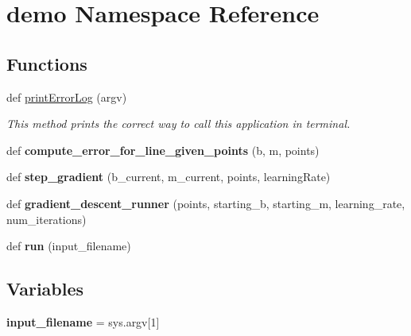 \hypertarget{namespacedemo}{}\section{demo Namespace Reference}
\label{namespacedemo}
\subsection*{Functions}
\begin{DoxyCompactItemize}
\item 
def \hyperlink{namespacedemo_a23277e53eb57a96c8b18995863f1d04b}{print\+Error\+Log} (argv)
\begin{DoxyCompactList}\small\item\em This method prints the correct way to call this application in terminal. \end{DoxyCompactList}\item 
def {\bfseries compute\+\_\+error\+\_\+for\+\_\+line\+\_\+given\+\_\+points} (b, m, points)\hypertarget{namespacedemo_a76e4af918335272a62d51f5d40c4bf59}{}\label{namespacedemo_a76e4af918335272a62d51f5d40c4bf59}

\item 
def {\bfseries step\+\_\+gradient} (b\+\_\+current, m\+\_\+current, points, learning\+Rate)\hypertarget{namespacedemo_aabf6ac3a1e04d278cceeffa54c1a0e2e}{}\label{namespacedemo_aabf6ac3a1e04d278cceeffa54c1a0e2e}

\item 
def {\bfseries gradient\+\_\+descent\+\_\+runner} (points, starting\+\_\+b, starting\+\_\+m, learning\+\_\+rate, num\+\_\+iterations)\hypertarget{namespacedemo_a370d216091141a2ec5febb644b0c62ad}{}\label{namespacedemo_a370d216091141a2ec5febb644b0c62ad}

\item 
def {\bfseries run} (input\+\_\+filename)\hypertarget{namespacedemo_a2af6d30b6a407b68a17923f2f6e532fa}{}\label{namespacedemo_a2af6d30b6a407b68a17923f2f6e532fa}

\end{DoxyCompactItemize}
\subsection*{Variables}
\begin{DoxyCompactItemize}
\item 
{\bfseries input\+\_\+filename} = sys.\+argv\mbox{[}1\mbox{]}\hypertarget{namespacedemo_adb3c4bcd9912be91e84a92ae6595e8be}{}\label{namespacedemo_adb3c4bcd9912be91e84a92ae6595e8be}

\end{DoxyCompactItemize}


